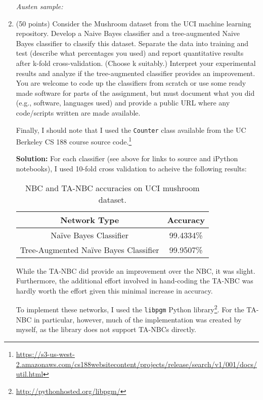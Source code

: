 \documentclass[11pt]{article}
\begin{document}
\begin{enumerate}
\textit{Austen sample:}

\item (50 points) Consider the Mushroom dataset from the UCI machine learning repository. Develop a Naive Bayes classifier and a tree-augmented Naive Bayes classifier to classify this dataset. Separate the data into training and test (describe what percentages you used) and report quantitative results after k-fold cross-validation. (Choose k suitably.) Interpret your experimental results and analyze if the tree-augmented classifier provides an improvement. You are welcome to code up the classifiers from scratch or use some ready made software for parts of the assignment, but must document what you did (e.g., software, languages used) and provide a public URL where any code/scripts written are made available.

Finally, I should note that I used the \verb|Counter| class available from the UC Berkeley CS 188 course source code.\footnote{\url{https://s3-us-west-2.amazonaws.com/cs188websitecontent/projects/release/search/v1/001/docs/util.html}}

\textbf{Solution:} For each classifier (see above for links to source and iPython notebooks), I used 10-fold cross validation to acheive the following results:

\begin{table}[h]
\centering
\begin{tabular}{c|c}
Network Type & Accuracy \\
\hline
Na\"ive Bayes Classifier & 99.4334\% \\
Tree-Augmented Na\"ive Bayes Classifier & 99.9507\% \\
\end{tabular}
\caption{NBC and TA-NBC accuracies on UCI mushroom dataset.}
\label{fig:possible}
\end{table}

While the TA-NBC did provide an improvement over the NBC, it was slight. Furthermore, the additional effort involved in hand-coding the TA-NBC was hardly worth the effort given this minimal increase in accuracy.

To implement these networks, I used the \verb|libpgm| Python library\footnote{\url{http://pythonhosted.org/libpgm/}}. For the TA-NBC in particular, however, much of the implementation was created by myself, as the library does not support TA-NBCs directly.

\end{enumerate}
\end{document}
